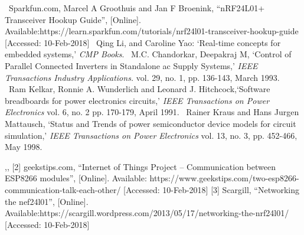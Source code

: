 \begin{thebibliography}{}
~Sparkfun.com, Marcel A Groothuis and Jan F Broenink,  “nRF24L01+ Transceiver Hookup Guide”, [Online]. Available:https://learn.sparkfun.com/tutorials/nrf24l01-transceiver-hookup-guide [Accessed: 10-Feb-2018]
~Qing Li, and Caroline Yao: `Real-time concepts for embedded systems,'  
\emph{CMP Books}. 
~M.C. Chandorkar, Deepakraj M, `Control of Parallel Connected Inverters in Standalone ac Supply Systems,'
\emph{IEEE Transactions Industry Applications.} vol. 29, no. 1, pp. 136-143, March 1993.
~Ram Kelkar, Ronnie A. Wunderlich and Leonard J. Hitchcock,`Software breadboards for power electronics circuits,'
\emph{IEEE Transactions on Power Electronics} vol. 6, no. 2 pp. 170-179, April 1991.
~Rainer Kraus and Hans Jurgen Mattausch, `Status and Trends of power semiconductor device models for circuit simulation,'
\emph{IEEE Transactions on Power Electronics} vol. 13, no. 3,  pp. 452-466, May 1998.

,,
[2] geekstips.com, “Internet of Things Project – Communication between ESP8266 modules”, [Online]. Available: https://www.geekstips.com/two-esp8266-communication-talk-each-other/ [Accessed: 10-Feb-2018] 
[3] Scargill, “Networking the nef24l01”, [Online]. Available:https://scargill.wordpress.com/2013/05/17/networking-the-nrf24l01/ [Accessed: 10-Feb-2018] 

\end{thebibliography}
